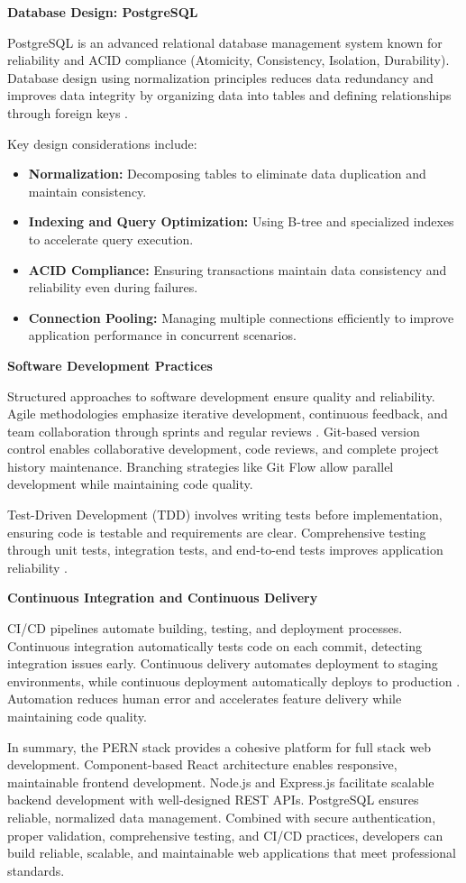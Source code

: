 \textbf{Database Design: PostgreSQL}

PostgreSQL is an advanced relational database management system known for reliability and ACID compliance (Atomicity, Consistency, Isolation, Durability). Database design using normalization principles reduces data redundancy and improves data integrity by organizing data into tables and defining relationships through foreign keys \parencite{Codd1970}.

Key design considerations include:
\begin{itemize}
    \item \textbf{Normalization:} Decomposing tables to eliminate data duplication and maintain consistency.
    \item \textbf{Indexing and Query Optimization:} Using B-tree and specialized indexes to accelerate query execution.
    \item \textbf{ACID Compliance:} Ensuring transactions maintain data consistency and reliability even during failures.
    \item \textbf{Connection Pooling:} Managing multiple connections efficiently to improve application performance in concurrent scenarios.
\end{itemize}

\textbf{Software Development Practices}

Structured approaches to software development ensure quality and reliability. Agile methodologies emphasize iterative development, continuous feedback, and team collaboration through sprints and regular reviews \parencite{Beck2001}. Git-based version control enables collaborative development, code reviews, and complete project history maintenance. Branching strategies like Git Flow allow parallel development while maintaining code quality.

Test-Driven Development (TDD) involves writing tests before implementation, ensuring code is testable and requirements are clear. Comprehensive testing through unit tests, integration tests, and end-to-end tests improves application reliability \parencite{Sommerville2010}.

\textbf{Continuous Integration and Continuous Delivery}

CI/CD pipelines automate building, testing, and deployment processes. Continuous integration automatically tests code on each commit, detecting integration issues early. Continuous delivery automates deployment to staging environments, while continuous deployment automatically deploys to production \parencite{Humble2010}. Automation reduces human error and accelerates feature delivery while maintaining code quality.

In summary, the PERN stack provides a cohesive platform for full stack web development. Component-based React architecture enables responsive, maintainable frontend development. Node.js and Express.js facilitate scalable backend development with well-designed REST APIs. PostgreSQL ensures reliable, normalized data management. Combined with secure authentication, proper validation, comprehensive testing, and CI/CD practices, developers can build reliable, scalable, and maintainable web applications that meet professional standards.